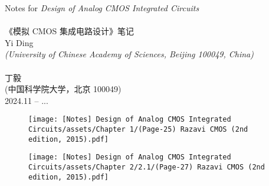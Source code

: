 \documentclass[UTF8]{report}
\begin{document}
 


\begin{titlepage}
\begin{center}
\vspace*{\fill}



{\huge 
    Notes for \textit{Design of Analog CMOS Integrated Circuits}
    \\ ~ \\
    《模拟 CMOS 集成电路设计》笔记
}
\\\vspace*{1.2cm}
{\large Yi Ding \\ \small\textit{(University of Chinese Academy of Sciences, Beijing 100049, China)} \\ ~ \\ 丁毅\\ \small {\kaishu (中国科学院大学，北京 100049)} }
\\\vspace*{0.8cm}
{\small
2024.11 -- ...
}
\end{center}
\vspace*{1cm}
\begin{figure}[H]\centering
    \texttt{[image: [Notes] Design of Analog CMOS Integrated Circuits/assets/Chapter 1/(Page-25) Razavi CMOS (2nd edition, 2015).pdf]}
\end{figure}
\vspace*{5mm}
\begin{figure}[H]\centering
    \texttt{[image: [Notes] Design of Analog CMOS Integrated Circuits/assets/Chapter 2/2.1/(Page-27) Razavi CMOS (2nd edition, 2015).pdf]}
\end{figure}


\vspace*{\fill}
%
\end{titlepage}
    \newpage  
    \thispagestyle{fancy}   %
\end{document}
